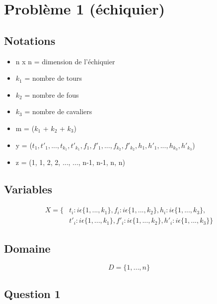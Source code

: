 \documentclass[a4paper,11pt]{article}
\begin{document}
\section{Problème 1 (échiquier)}
\subsection{Notations}
\begin{itemize}
\item n x n = dimension de l'échiquier
\item $k_{1}$ = nombre de tours
\item $k_{2}$ = nombre de fous
\item $k_{3}$ = nombre de cavaliers

\item m = ($k_{1}$ + $k_{2}$ + $k_{3}$)
\item y = ($t_{1}, t'_{1}, ..., t_{k_{1}}, t'_{k_{1}}, f_{1}, f'_{1}, ..., f_{k_{2}}, f'_{k_{2}}, h_{1}, h'_{1}, ..., h_{k_{3}}, h'_{k_{3}}$)
\item z = (1, 1, 2, 2, ..., ..., n-1, n-1, n, n)
\end{itemize}

\subsection{Variables}
\begin{equation}
  \begin{split}
    X = \{ &t_{i} : i \epsilon  \{1, ..., k_{1} \}, f_{i} : i \epsilon  \{1, ..., k_{2} \}, h_{i} : i \epsilon  \{1, ..., k_{3} \}, \\
    &t'_{i} : i \epsilon  \{1, ..., k_{1} \}, f'_{i} : i \epsilon  \{1, ..., k_{2} \}, h'_{i} : i \epsilon  \{1, ..., k_{3} \} \}
  \end{split}
\end{equation}

\subsection{Domaine}
$$D = \{1, ..., n \}$$

\subsection{Question 1}
\end{document}
